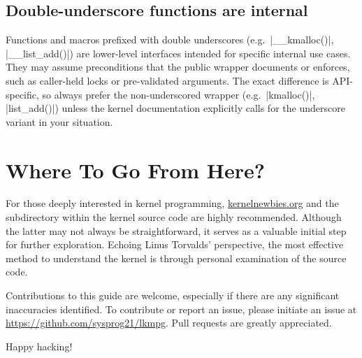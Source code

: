 \documentclass[10pt, oneside]{book}
\begin{document}
\subsection{Double-underscore functions are internal}
\label{sec:double_underscore}
Functions and macros prefixed with double underscores (e.g.\ \cpp|__kmalloc()|, \cpp|__list_add()|) are lower-level interfaces intended for specific internal use cases.
They may assume preconditions that the public wrapper documents or enforces, such as caller-held locks or pre-validated arguments.
The exact difference is API-specific, so always prefer the non-underscored wrapper (e.g.\ \cpp|kmalloc()|, \cpp|list_add()|) unless the kernel documentation explicitly calls for the underscore variant in your situation.

\section{Where To Go From Here?}
\label{sec:where_to_go}
For those deeply interested in kernel programming,
\href{https://kernelnewbies.org}{kernelnewbies.org} and the  subdirectory within the kernel source code are highly recommended.
Although the latter may not always be straightforward, it serves as a valuable initial step for further exploration.
Echoing Linus Torvalds' perspective, the most effective method to understand the kernel is through personal examination of the source code.

Contributions to this guide are welcome, especially if there are any significant inaccuracies identified.
To contribute or report an issue, please initiate an issue at \url{https://github.com/sysprog21/lkmpg}.
Pull requests are greatly appreciated.

Happy hacking!
\end{document}
